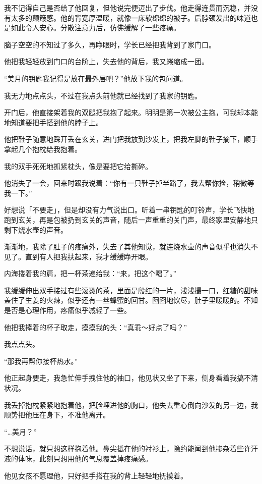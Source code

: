 我不记得自己是否给了他回复，但他说完便迈出了步伐。他走得连贯而沉稳，并没有太多的颠簸感。他的背宽厚温暖，就像一床软绵绵的被子。后脖颈发出的味道也是如此令人安心。分散注意力后，仿佛缓解了一些疼痛。

脑子空空的不知过了多久，再睁眼时，学长已经把我背到了家门口。

他把我轻轻放到门口的台阶上，失去他的背后，我又蜷缩成一团。

“美月的钥匙我记得是放在最外层吧？”他放下我的包问道。

我无力地点点头，不过在我点头前他就已经找到了我家的钥匙。

开门后，他直接架着我的双腿把我抱了起来。明明是第一次被公主抱，可我却本能地知道要把手搭到他的脖子上。

他把鞋子随意地踩开丢在玄关，进门把我放到沙发上，把我左脚的鞋子摘下，顺手拿起几个抱枕给我抱着。

我的双手死死地抓紧枕头，像是要把它给撕碎。

他消失了一会，回来时跟我说着：“你有一只鞋子掉半路了，我去帮你捡，稍微等我一下。”

好想说「不要走」，但是却没有力气说出口。听着一串钥匙的叮铃声，学长飞快地跑到玄关，再是包被扔到玄关的声音，随后一声重重的关门声，最终家里安静地只剩下烧水壶的声音。

渐渐地，我除了肚子的疼痛外，失去了其他知觉，就连烧水壶的声音似乎也消失不见了。直到有人把我扶起来，我才缓缓睁开眼。

内海搂着我的肩，把一杯茶递给我：“来，把这个喝了。”

我缓缓伸出双手接过有些滚烫的茶，里面是殷红的一片，浅浅撮一口，红糖的甜味盖住了生姜的火辣，似乎还有一丝蜂蜜的回甘。囫囵地饮尽，肚子里暖暖的。不知是否是心理作用，疼痛似乎减轻了一些。

他把我捧着的杯子取走，摸摸我的头：“真乖～好点了吗？”

我点点头。



“那我再帮你接杯热水。”

他正起身要走，我急忙伸手拽住他的袖口，他见状又坐了下来，侧身看着我搞不清状况。

我丢掉抱枕紧紧地抱着他，把脸埋进他的胸口，他失去重心倒向沙发的另一边，我顺势把他压在身下，不准他离开。

“…美月？”

不想说话，就只想这样抱着他。鼻尖抵在他的衬衫上，隐约能闻到他掺杂着些许汗液的体味，此刻只想用他的气息覆盖掉疼痛感。

他见女孩不愿理他，只好把手搭在我的背上轻轻地抚摸着。


